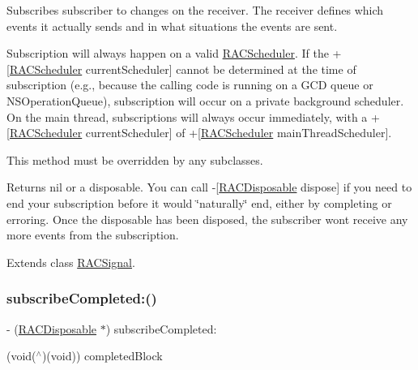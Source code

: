 Subscribes {\ttfamily subscriber} to changes on the receiver. The receiver defines which events it actually sends and in what situations the events are sent.

Subscription will always happen on a valid \mbox{\hyperlink{interface_r_a_c_scheduler}{R\+A\+C\+Scheduler}}. If the +\mbox{[}\mbox{\hyperlink{interface_r_a_c_scheduler}{R\+A\+C\+Scheduler}} current\+Scheduler\mbox{]} cannot be determined at the time of subscription (e.\+g., because the calling code is running on a G\+CD queue or N\+S\+Operation\+Queue), subscription will occur on a private background scheduler. On the main thread, subscriptions will always occur immediately, with a +\mbox{[}\mbox{\hyperlink{interface_r_a_c_scheduler}{R\+A\+C\+Scheduler}} current\+Scheduler\mbox{]} of +\mbox{[}\mbox{\hyperlink{interface_r_a_c_scheduler}{R\+A\+C\+Scheduler}} main\+Thread\+Scheduler\mbox{]}.

This method must be overridden by any subclasses.

Returns nil or a disposable. You can call -\/\mbox{[}\mbox{\hyperlink{interface_r_a_c_disposable}{R\+A\+C\+Disposable}} dispose\mbox{]} if you need to end your subscription before it would \char`\"{}naturally\char`\"{} end, either by completing or erroring. Once the disposable has been disposed, the subscriber won\textquotesingle{}t receive any more events from the subscription. 

Extends class \mbox{\hyperlink{interface_r_a_c_signal_aeab76d632d98bbc321ec5e19575377eb}{R\+A\+C\+Signal}}.

\mbox{\label{category_r_a_c_signal_07_subscription_08_a3927c94bfca5db9dad133dd7c45563f3}} 
\subsubsection{\texorpdfstring{subscribe\+Completed\+:()}{subscribeCompleted:()}\hspace{0.1cm}{\footnotesize\ttfamily [1/3]}}
{\footnotesize\ttfamily -\/ (\mbox{\hyperlink{interface_r_a_c_disposable}{R\+A\+C\+Disposable}} $\ast$) subscribe\+Completed\+: \begin{DoxyParamCaption}\item[{(void($^\wedge$)(void))}]{completed\+Block }\end{DoxyParamCaption}}

